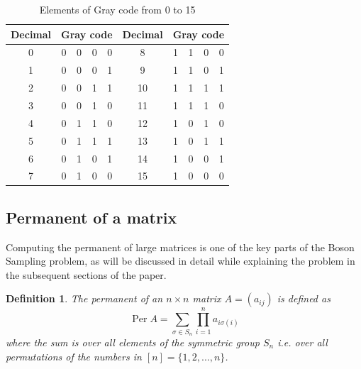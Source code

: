 \documentclass[ %
                    author={Manan Vaswani},
                supervisor={Dr. Raphael Clifford},
                    degree={MEng},
                     title={A multi-core CPU implementation of the classical Boson Sampling algorithm},
                  subtitle={},
                      type={},
                      year={2019} ]{dissertation}
\theoremstyle{plain}
\newtheorem{definition}{Definition}
\theoremstyle{definition}
\DeclareMathOperator*{\Per}{\mathrm{Per}}
\begin{document}
\begin{table}[h!]
  \begin{center}
    \caption{Elements of Gray code from 0 to 15}
    \label{tab:gray_code_prelim}
    \begin{tabular}{|c|c c c c|| c| c c c c|}
    \hline
      \textbf{Decimal} & \multicolumn{4}{|c||}{\textbf{Gray code}} & \textbf{Decimal} & \multicolumn{4}{|c|}{\textbf{Gray code}}\\
      \hline
      0 & 0 & 0 & 0 & 0 & 8 & 1 & 1 & 0 & 0\\
      1 & 0 & 0 & 0 & 1 & 9 & 1 & 1 & 0 & 1\\
      2 & 0 & 0 & 1 & 1 & 10 & 1 & 1 & 1 & 1\\
      3 & 0 & 0 & 1 & 0 & 11 & 1 & 1 & 1 & 0\\
      4 & 0 & 1 & 1 & 0 & 12 & 1 & 0 & 1 & 0\\
      5 & 0 & 1 & 1 & 1 & 13 & 1 & 0 & 1 & 1\\
      6 & 0 & 1 & 0 & 1 & 14 & 1 & 0 & 0 & 1\\
      7 & 0 & 1 & 0 & 0 & 15 & 1 & 0 & 0 & 0\\
      \hline
    \end{tabular}
  \end{center}
\end{table}

\subsection{Permanent of a matrix} \label{sec:permanent}
Computing the permanent of large matrices is one of the key parts of the Boson Sampling problem, as will be discussed in detail while explaining the problem in the subsequent sections of the paper.
\begin{definition}{\cite{marcus_minc66}}
The permanent of an $n \times n$ matrix $A = (a_{ij})$ is defined as
\begin{equation}
\Per A = \sum_{\sigma \in S_n} \prod_{i=1}^n a_{i\sigma(i)}
\end{equation}
where the sum is over all elements of the symmetric group $S_n$ i.e. over all permutations of the numbers in $[n] = \{1, 2, ... , n\}$.
\end{definition}
\end{document}
